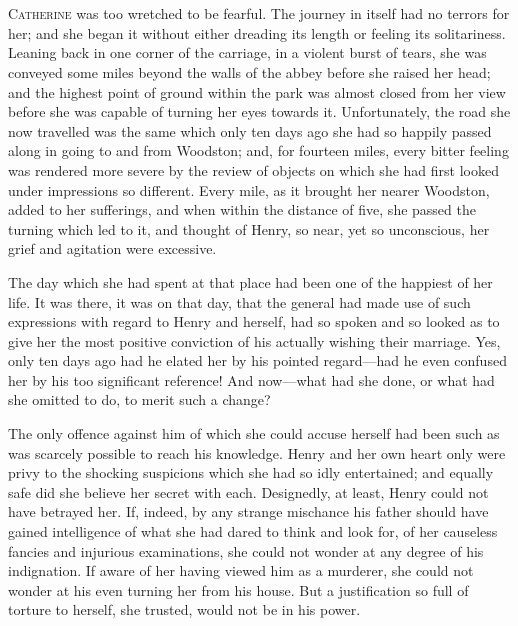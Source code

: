 \chapter[Chapter \thechapter]{} 

 \lettrine{C}{atherine} was too wretched to be fearful. The journey in itself had no terrors for her; and she began it without either dreading its length or feeling its solitariness. Leaning back in one corner of the carriage, in a violent burst of tears, she was conveyed some miles beyond the walls of the abbey before she raised her head; and the highest point of ground within the park was almost closed from her view before she was capable of turning her eyes towards it. Unfortunately, the road she now travelled was the same which only ten days ago she had so happily passed along in going to and from Woodston; and, for fourteen miles, every bitter feeling was rendered more severe by the review of objects on which she had first looked under impressions so different. Every mile, as it brought her nearer Woodston, added to her sufferings, and when within the distance of five, she passed the turning which led to it, and thought of Henry, so near, yet so unconscious, her grief and agitation were excessive. 

 The day which she had spent at that place had been one of the happiest of her life. It was there, it was on that day, that the general had made use of such expressions with regard to Henry and herself, had so spoken and so looked as to give her the most positive conviction of his actually wishing their marriage. Yes, only ten days ago had he elated her by his pointed regard—had he even confused her by his too significant reference! And now—what had she done, or what had she omitted to do, to merit such a change? 

 The only offence against him of which she could accuse herself had been such as was scarcely possible to reach his knowledge. Henry and her own heart only were privy to the shocking suspicions which she had so idly entertained; and equally safe did she believe her secret with each. Designedly, at least, Henry could not have betrayed her. If, indeed, by any strange mischance his father should have gained intelligence of what she had dared to think and look for, of her causeless fancies and injurious examinations, she could not wonder at any degree of his indignation. If aware of her having viewed him as a murderer, she could not wonder at his even turning her from his house. But a justification so full of torture to herself, she trusted, would not be in his power. 

